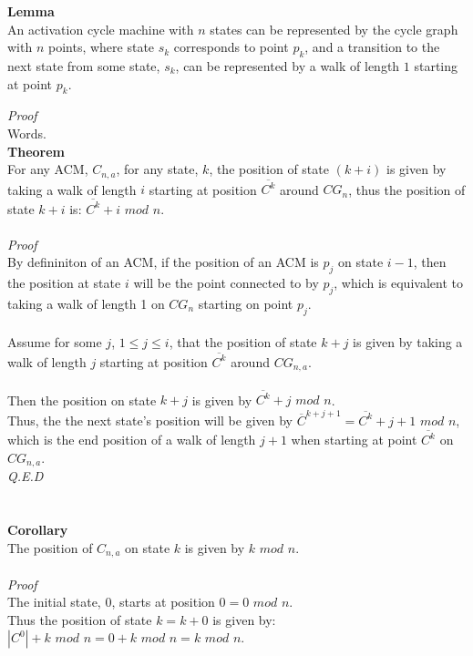 \documentclass[a4paper,12pt]{article}
\begin{document}
\begin{tcolorbox}
\textbf{Lemma}\\
An activation cycle machine with $n$ states can be represented by the cycle graph with $n$ points, where state $s_k$ corresponds to point $p_k$, and a transition to the next state from some state, $s_k$, can be represented by a walk of length $1$ starting at point $p_k$.
\end{tcolorbox}
\noindent
\textit{Proof}\\
Words.\\
\textbf{Theorem}\\
For any ACM, $C_{n,a}$, for any state, $k$, the position of state $(k + i)$ is given by taking a walk of length $i$ starting at position $\overline{C^k}$ around $CG_n$, thus the position of state $k + i$ is: $\overline{C^k} + i$ $mod$ $n$.\\
\\
\textit{Proof}\\
By defininiton of an ACM, if the position of an ACM is $p_j$ on state $i - 1$, then the position at state $i$ will be the point connected to by $p_j$, which is equivalent to taking a walk of length 1 on $CG_n$ starting on point $p_j$.\\
\\
Assume for some $j$, $1 \leq j \leq i$, that the position of state $k + j$ is given by taking a walk of length $j$ starting at position $\overline{C^k}$ around $CG_{n,a}$.\\
\\
Then the position on state $k + j$ is given by $\overline{C^k} + j$ $mod$ $n$.\\
Thus, the the next state's position will be given by $\overline{C}^{k + j + 1} = \overline{C^k} + j + 1$ $mod$ $n$, which is the end position of a walk of length $j + 1$ when starting at point $\overline{C^k}$ on $CG_{n,a}$.\\
\textit{Q.E.D}\\
\\
\\
\textbf{Corollary}\\
The position of $C_{n,a}$ on state $k$ is given by $k$ $mod$ $n$.\\
\\
\textit{Proof}\\ 
The initial state, $0$, starts at position $0 = 0$ $mod$ $n$.\\
Thus the position of state $k = k + 0$ is given by:\\
$|C^0| + k$ $mod$ $n = 0 + k$ $mod$ $n = k$ $mod$ $n$.\\
\end{document}
